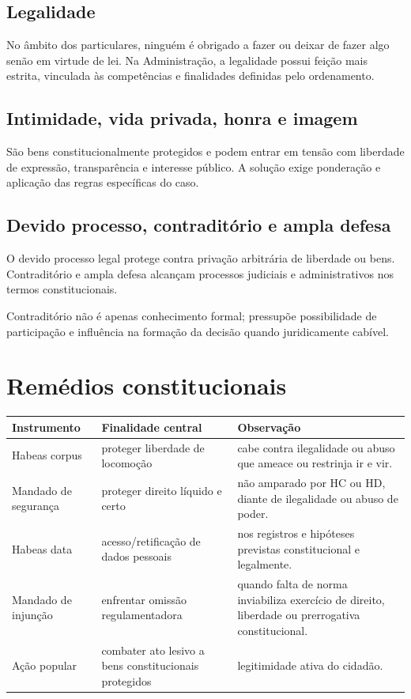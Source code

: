 \subsection{Legalidade}

No âmbito dos particulares, ninguém é obrigado a fazer ou deixar de fazer algo senão em virtude de lei. Na Administração, a legalidade possui feição mais estrita, vinculada às competências e finalidades definidas pelo ordenamento.

\subsection{Intimidade, vida privada, honra e imagem}

São bens constitucionalmente protegidos e podem entrar em tensão com liberdade de expressão, transparência e interesse público. A solução exige ponderação e aplicação das regras específicas do caso.

\subsection{Devido processo, contraditório e ampla defesa}

O devido processo legal protege contra privação arbitrária de liberdade ou bens. Contraditório e ampla defesa alcançam processos judiciais e administrativos nos termos constitucionais.

Contraditório não é apenas conhecimento formal; pressupõe possibilidade de participação e influência na formação da decisão quando juridicamente cabível.

\section{Remédios constitucionais}

\begin{table}[ht]
\centering
\small
\begin{tabularx}{\textwidth}{l X X}
\toprule
Instrumento & Finalidade central & Observação \\
\midrule
Habeas corpus & proteger liberdade de locomoção & cabe contra ilegalidade ou abuso que ameace ou restrinja ir e vir. \\
Mandado de segurança & proteger direito líquido e certo & não amparado por HC ou HD, diante de ilegalidade ou abuso de poder. \\
Habeas data & acesso/retificação de dados pessoais & nos registros e hipóteses previstas constitucional e legalmente. \\
Mandado de injunção & enfrentar omissão regulamentadora & quando falta de norma inviabiliza exercício de direito, liberdade ou prerrogativa constitucional. \\
Ação popular & combater ato lesivo a bens constitucionais protegidos & legitimidade ativa do cidadão. \\
\bottomrule
\end{tabularx}
\end{table}

